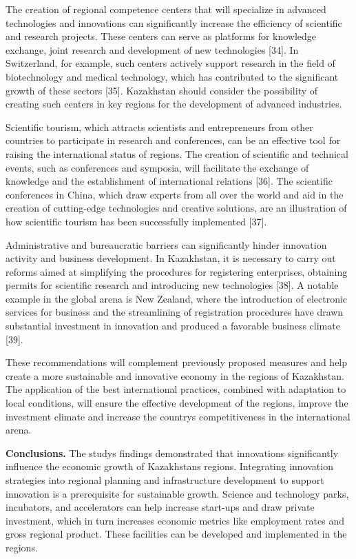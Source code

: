 \begin{multicols}{2}
The creation of regional competence centers that will specialize in
advanced technologies and innovations can significantly increase the
efficiency of scientific and research projects. These centers can serve
as platforms for knowledge exchange, joint research and development of
new technologies {[}34{]}. In Switzerland, for example, such centers
actively support research in the field of biotechnology and medical
technology, which has contributed to the significant growth of these
sectors {[}35{]}. Kazakhstan should consider the possibility of creating
such centers in key regions for the development of advanced industries.

Scientific tourism, which attracts scientists and entrepreneurs from
other countries to participate in research and conferences, can be an
effective tool for raising the international status of regions. The
creation of scientific and technical events, such as conferences and
symposia, will facilitate the exchange of knowledge and the
establishment of international relations {[}36{]}. The scientific
conferences in China, which draw experts from all over the world and aid
in the creation of cutting-edge technologies and creative solutions, are
an illustration of how scientific tourism has been successfully
implemented {[}37{]}.

Administrative and bureaucratic barriers can significantly hinder
innovation activity and business development. In Kazakhstan, it is
necessary to carry out reforms aimed at simplifying the procedures for
registering enterprises, obtaining permits for scientific research and
introducing new technologies {[}38{]}. A notable example in the global
arena is New Zealand, where the introduction of electronic services for
business and the streamlining of registration procedures have drawn
substantial investment in innovation and produced a favorable business
climate {[}39{]}.

These recommendations will complement previously proposed measures and
help create a more sustainable and innovative economy in the regions of
Kazakhstan. The application of the best international practices,
combined with adaptation to local conditions, will ensure the effective
development of the regions, improve the investment climate and increase
the country\textquotesingle s competitiveness in the international
arena.

{\bfseries Conclusions.} The study\textquotesingle s findings demonstrated
that innovations significantly influence the economic growth of
Kazakhstan\textquotesingle s regions. Integrating innovation strategies
into regional planning and infrastructure development to support
innovation is a prerequisite for sustainable growth. Science and
technology parks, incubators, and accelerators can help increase
start-ups and draw private investment, which in turn increases economic
metrics like employment rates and gross regional product. These
facilities can be developed and implemented in the regions.


\end{multicols}
